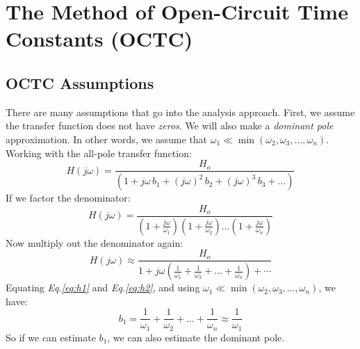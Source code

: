 \section{The Method of Open-Circuit Time Constants (OCTC)}
\subsection{OCTC Assumptions}
There are many assumptions that go into the analysis approach.  First, we assume the transfer function does not have \textit{zeros}.  We will also make a  \textit{dominant pole} approximation.  In other words, we assume that $\omega_1 \ll \min(\omega_2, \omega_3, \dots, \omega_n)$. Working with the all-pole transfer function:
    \begin{equation}
        H(j\omega) = \frac{H_o}{\left(1 + j\omega\,b_1 + {(j\omega)}^2\,b_2 + {(j\omega)}^3\,b_3 + \dots \right)}
        \label{eq:h1}
    \end{equation}
If we factor the denominator:
    \begin{equation}
        H(j\omega) = \frac{H_o}{\left(1 + \frac{j\omega}{\omega_1}\right)
                                \left(1 + \frac{j\omega}{\omega_2}\right)
                                \dots \left(1 + \frac{j\omega}{\omega_n}\right)}
    \end{equation}
Now multiply out the denominator again:
    \begin{equation}  
        H(j\omega) \approx \frac{H_o}{1 + j\omega \left(\frac{1}{\omega_1} + \frac{1}{\omega_2}
                                + \dots + \frac{1}{\omega_n}\right) + \cdots}
        \label{eq:h2}
    \end{equation}
Equating \emph{Eq.\ref{eq:h1}} and \emph{Eq.\ref{eq:h2}}, and using $\omega_1 \ll \min(\omega_2, \omega_3, \dots, \omega_n)$, we have:
    \begin{equation} 
        b_1 = \frac{1}{\omega_1} + \frac{1}{\omega_2} + \dots + \frac{1}{\omega_n} \approx \boxed{\frac{1}{\omega_1}}
        \label{eq:octc_b1}
    \end{equation}
So if we can estimate $b_1$, we can also estimate the dominant pole.

